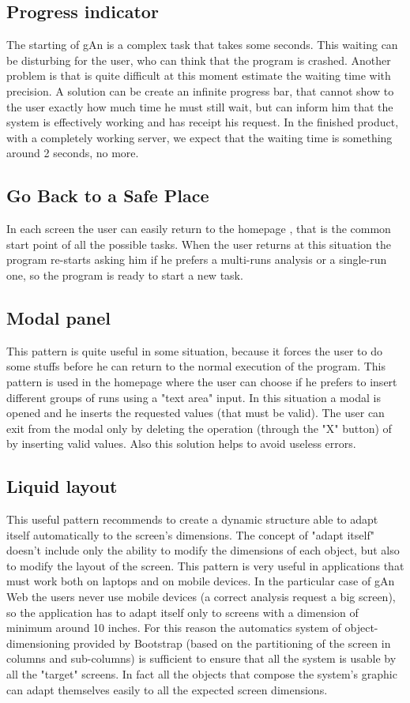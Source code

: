 \subsection{Progress indicator}
The starting of gAn is a complex task that takes some seconds. This waiting can be disturbing for the user, who can think that the program is crashed. Another problem is that is quite difficult at this moment estimate the waiting time with precision. A solution can be create an infinite progress bar, that cannot show to the user exactly how much time he must still wait, but can inform him that the system is effectively working and has receipt his request. In the finished product, with a completely working server, we expect that the waiting time is something around 2 seconds, no more. 

\subsection{Go Back to a Safe Place}
In each screen the user can easily return to the homepage , that is the common start point of all the possible tasks. When the user returns at this situation the program re-starts asking him if he prefers a multi-runs analysis or a single-run one, so the program is ready to start a new task. 

\subsection{Modal panel}
This pattern is quite useful in some situation, because it forces the user to do some stuffs before he can return to the normal execution of the program. This pattern is used in the homepage where the user can choose if he prefers to insert different groups of runs using a "text area" input. In this situation a modal is opened and he inserts the requested values (that must be valid). The user can exit from the modal only by deleting the operation (through the "X" button) of by inserting valid values. Also this solution helps to avoid useless errors. 

\subsection{Liquid layout}

This useful pattern recommends to create a dynamic structure able to adapt itself automatically to the screen's dimensions. The concept of "adapt itself" doesn't include only the ability to modify the dimensions of each object, but also to modify the layout of the screen. This pattern is very useful in applications that must work both on laptops and on mobile devices. In the particular case of gAn Web the users never use mobile devices (a correct analysis request a big screen), so the application has to adapt itself only to screens with a dimension of minimum around 10 inches. For this reason the automatics system of object-dimensioning provided by Bootstrap (based on the partitioning of the screen in columns and sub-columns) is sufficient to ensure that all the system is usable by all the "target" screens. In fact all the objects that compose the system's graphic can adapt themselves easily to all the expected screen dimensions. 



